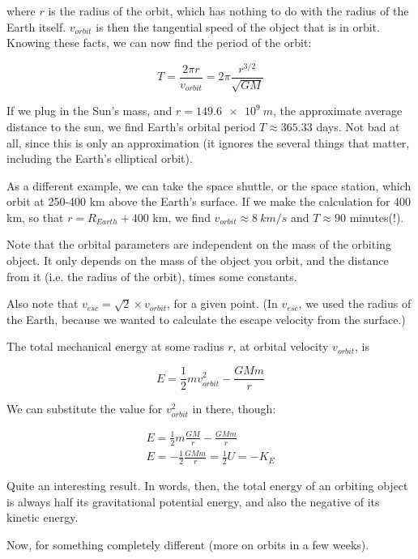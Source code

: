 \documentclass[8.01x]{subfiles}
\begin{document}
where $r$ is the radius of the orbit, which has nothing to do with the radius of the Earth itself. $v_{orbit}$ is then the tangential speed of the object that is in orbit. Knowing these facts, we can now find the period of the orbit:

\begin{equation}
T = \frac{2 \pi r}{v_{orbit}} = 2 \pi \frac{r^{3/2}}{\sqrt{G M}}
\end{equation}

If we plug in the Sun's mass, and $r = \SI{149.6e9}{m}$, the approximate average distance to the sun, we find Earth's orbital period $T \approx 365.33$ days. Not bad at all, since this is only an approximation (it ignores the several things that matter, including the Earth's elliptical orbit).

As a different example, we can take the space shuttle, or the space station, which orbit at 250-400 km above the Earth's surface. If we make the calculation for 400 km, so that $r = R_{Earth} + 400$ km, we find $v_{orbit} \approx \SI{8}{km/s}$ and $T \approx 90$ minutes(!).

Note that the orbital parameters are independent on the mass of the orbiting object. It only depends on the mass of the object you orbit, and the distance from it (i.e. the radius of the orbit), times some constants.

Also note that $v_{esc} = \sqrt{2} \times v_{orbit}$, for a given point. (In $v_{esc}$, we used the radius of the Earth, because we wanted to calculate the escape velocity from the surface.)

The total mechanical energy at some radius $r$, at orbital velocity $v_{orbit}$, is

\begin{equation}
E = \frac{1}{2} m v_{orbit}^2 - \frac{G M m}{r}
\end{equation}

We can substitute the value for $v_{orbit}^2$ in there, though:

\begin{align}
E = \frac{1}{2} m \frac{G M}{r} - \frac{G M m}{r}\\
E = -\frac{1}{2} \frac{G M m}{r} = \frac{1}{2} U = - K_E
\end{align}

Quite an interesting result. In words, then, the total energy of an orbiting object is always half its gravitational potential energy, and also the negative of its kinetic energy.

Now, for something completely different (more on orbits in a few weeks).
\end{document}
